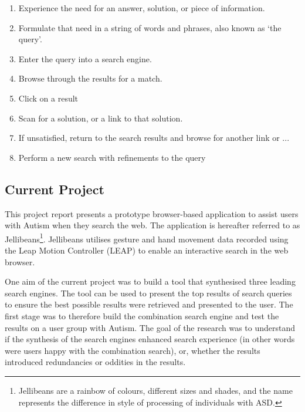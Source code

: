 \documentclass[a4paper, 11pt]{article}
\begin{document}
\begin{enumerate}
\item{Experience the need for an answer,
solution, or piece of information.}
\item{Formulate that need in a string of words and phrases, also known as `the query'.}
\item{Enter the query into a search engine.}
\item{Browse through the results for a match.}
\item{Click on a result}
\item{Scan for a solution, or a link to that solution.}
\item{If unsatisfied, return to the search results and browse for another link or ...}
\item{Perform a new search with refinements to the query}
\label{search flows}
\end {enumerate}

\subsection{Current Project}
This project report presents a prototype browser-based application to assist users with Autism when they search the web. The application is hereafter referred to as Jellibeans\footnote{Jellibeans are a rainbow of colours, different sizes and shades, and the name represents the difference in style of processing of individuals with ASD.}. Jellibeans utilises gesture and hand movement data recorded using the Leap Motion Controller (LEAP) to enable an interactive search in the web browser. 

\vspace{5mm}
One aim of the current project was to build a tool that synthesised three leading search engines. The tool can be used to present the top results of search queries to ensure the best possible results were retrieved and presented to the user. The first stage was to therefore build the combination search engine and test the results on a user group with Autism. The goal of the research was to understand if the synthesis of the search engines enhanced search experience (in other words were users happy with the combination search), or, whether the results introduced redundancies or oddities in the results.\\
\end{document}
